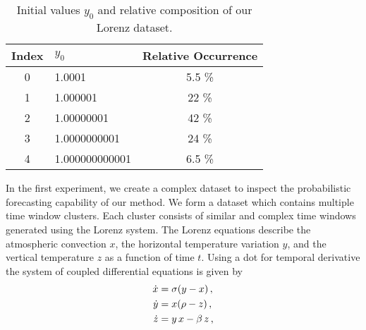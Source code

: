 \documentclass{ieeeaccess}
\begin{document}
\begin{table}
	\centering
	\caption{Initial values $y_0$ and relative composition of our Lorenz dataset.}
	\renewcommand{\arraystretch}{1.5}
	\begin{tabular}{clc}
		\toprule
		\textbf{Index} & $y_0$ & \textbf{Relative Occurrence} \\
		\midrule
		0 & 1.0001         & 5.5 \% \\
		1 & 1.000001       & 22 \%  \\
		2 & 1.00000001     & 42 \%  \\
		3 & 1.0000000001   & 24 \%  \\
		4 & 1.000000000001 & 6.5 \% \\
		\bottomrule
	\end{tabular}
	\label{tab:composition}
\end{table}
In the first experiment, we create a complex dataset to inspect the probabilistic forecasting capability of our method.  We form a dataset which contains multiple time window clusters. Each cluster consists of similar and complex time windows generated using the Lorenz system. The Lorenz equations describe the atmospheric convection $x$, the horizontal temperature variation $y$, and the vertical temperature $z$ as a function of time $t$. Using a dot for temporal derivative the system of coupled differential equations is given by
\begin{align}
\dot{x} &= \sigma (y-x)\,, \notag\\
\dot{y} &= x ( \rho -z)\,, \notag\\
\dot{z} &= y\,x - \beta\,z\,, 
\label{eq:lorenz}
\end{align}
\end{document}
